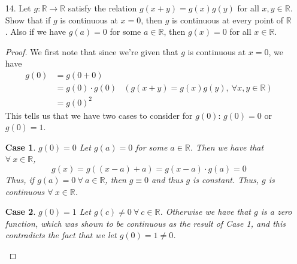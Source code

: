 \documentclass[12pt,letterpaper]{article}
\newcommand{\st}{\ \text{s.t.}\ }
\newcommand{\R}{\mathbb{R}}
\newcommand{\Q}{\mathbb{Q}}
\theoremstyle{case}
\newtheorem{case}{Case}
\theoremstyle{definition}
\begin{document}
\begin{enumerate}
\begin{enumerate}
			This is actually true.
			\begin{proof}
				Let $x \in \R$ be arbitrary. By the \textit{Density Theorem}, we know that we can find a sequence $(x_n) \subset \Q \st (x_n) \to x$.\\
				
				Then we have:
				\begin{align*}
					f(x) &= \lim\limits_{n \to \infty} f(x_n) &(f\text{ is continuous}) \\
					&= \lim\limits_{n \to \infty} g(x_n) &(x_n \in \Q) \\
					&= g(x) &(g\text{ is continuous}) \\
					\implies f(x) &= g(x)\ \forall\ x \in \R
				\end{align*}
			\end{proof}
			
			\item[14.] Let $g:\R \to \R$ satisfy the relation $g(x+y)=g(x)g(y)$ for all $x,y \in \R$. Show that if $g$ is continuous at $x=0$, then $g$ is continuous at every point of $\R$. Also if we have $g(a)=0$ for some $a \in \R$, then $g(x)=0$ for all $x \in \R$.\\
			
			\begin{proof}
				We first note that since we're given that $g$ is continuous at $x=0$, we have
				\begin{align*}
					g(0) &= g(0+0) \\
					&=g(0) \cdot g(0) &(g(x+y)=g(x)g(y),\ \forall x,y \in \R) \\
					&=g(0)^2
				\end{align*}
				This tells us that we have two cases to consider for $g(0)$: $g(0)=0$ or $g(0)=1$.\\
				
				\begin{case}{$g(0)=0$}
					Let $g(a)=0$ for some $a \in \R$. Then we have that $\forall\ x \in \R$,
					\[g(x) = g((x-a)+a)=g(x-a) \cdot g(a)=0\]
					Thus, if $g(a)=0\ \forall\ a \in \R$, then $g \equiv 0$ and thus $g$ is constant. Thus, $g$ is continuous $\forall\ x \in \R$.
				\end{case}
			
				\begin{case}{$g(0)=1$}
					Let $g(c) \neq 0\ \forall\ c \in \R$. Otherwise we have that $g$ is a zero function, which was shown to be continuous as the result of \textit{Case 1}, and this contradicts the fact that we let $g(0)=1 \neq 0$.\\
					

\end{case}
\end{proof}
\end{enumerate}
\end{enumerate}
\end{document}
